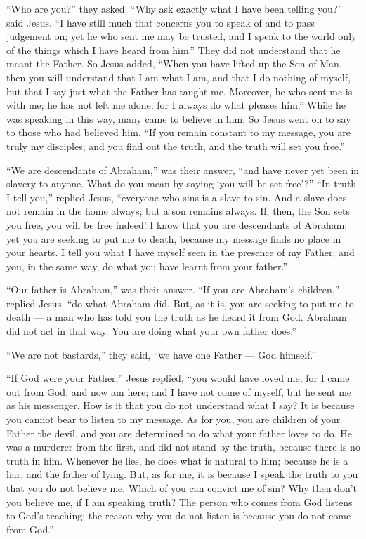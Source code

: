  ``Who are you?'' they asked. ``Why ask exactly what I have
been telling you?'' said Jesus.  ``I have still much that
concerns you to speak of and to pass judgement on; yet he who sent me
may be trusted, and I speak to the world only of the things which I have
heard from him.''  They did not understand that he meant
the Father.  So Jesus added, ``When you have lifted up the
Son of Man, then you will understand that I am what I am, and that I do
nothing of myself, but that I say just what the Father has taught me.
 Moreover, he who sent me is with me; he has not left me
alone; for I always do what pleases him.''  While he was
speaking in this way, many came to believe in him.  So
Jesus went on to say to those who had believed him, ``If you remain
constant to my message, you are truly my disciples;  and
you find out the truth, and the truth will set you free.''

 ``We are descendants of Abraham,'' was their answer, ``and
have never yet been in slavery to anyone. What do you mean by saying
`you will be set free'?''  ``In truth I tell you,'' replied
Jesus, ``everyone who sins is a slave to sin.  And a slave
does not remain in the home always; but a son remains always.
 If, then, the Son sets you free, you will be free indeed!
 I know that you are descendants of Abraham; yet you are
seeking to put me to death, because my message finds no place in your
hearts.  I tell you what I have myself seen in the presence
of my Father; and you, in the same way, do what you have learnt from
your father.''

 ``Our father is Abraham,'' was their answer. ``If you are
Abraham's children,'' replied Jesus, ``do what Abraham did.
 But, as it is, you are seeking to put me to death --- a
man who has told you the truth as he heard it from God. Abraham did not
act in that way.  You are doing what your own father
does.''

``We are not bastards,'' they said, ``we have one Father --- God
himself.''

 ``If God were your Father,'' Jesus replied, ``you would
have loved me, for I came out from God, and now am here; and I have not
come of myself, but he sent me as his messenger.  How is it
that you do not understand what I say? It is because you cannot bear to
listen to my message.  As for you, you are children of your
Father the devil, and you are determined to do what your father loves to
do. He was a murderer from the first, and did not stand by the truth,
because there is no truth in him. Whenever he lies, he does what is
natural to him; because he is a liar, and the father of lying.
 But, as for me, it is because I speak the truth to you
that you do not believe me.  Which of you can convict me of
sin? Why then don't you believe me, if I am speaking truth?
 The person who comes from God listens to God's teaching;
the reason why you do not listen is because you do not come from God.''


